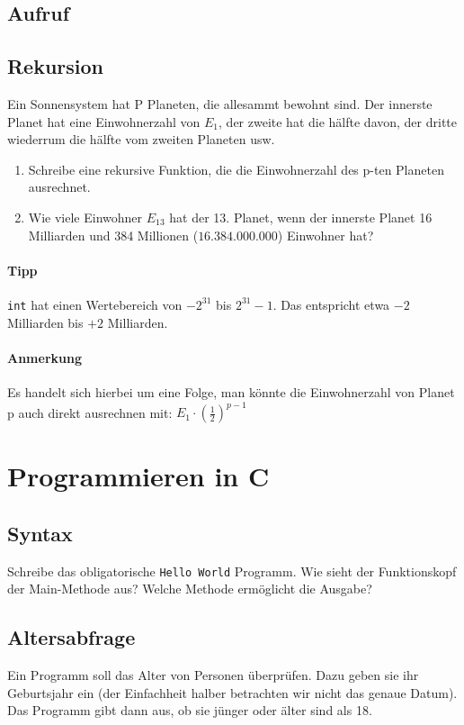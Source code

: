\documentclass[11pt, a4paper]{article}
\begin{document}




\subsection{Aufruf}

\subsection{Rekursion}
Ein Sonnensystem hat P Planeten, die allesammt bewohnt sind. Der innerste Planet hat eine Einwohnerzahl von $E_1$, der zweite hat die hälfte davon, der dritte wiederrum die hälfte vom zweiten Planeten usw.
\begin{enumerate}
	\item Schreibe eine rekursive Funktion, die die Einwohnerzahl des p-ten Planeten ausrechnet.
	\item Wie viele Einwohner $E_{13}$ hat der 13. Planet, wenn der innerste Planet 16 Milliarden und 384 Millionen ($16.384.000.000$) Einwohner hat?
\end{enumerate}
\paragraph{Tipp} \texttt{int} hat einen Wertebereich von $-2^{31}$ bis $2^{31}-1$. Das entspricht etwa $-2$ Milliarden bis $+2$ Milliarden.
\paragraph{Anmerkung} Es handelt sich hierbei um eine Folge, man könnte die Einwohnerzahl von Planet p auch direkt ausrechnen mit: $E_1 \cdot \left(\frac{1}{2}\right)^{p-1}$


\newpage
\section{Programmieren in C}
\subsection{Syntax}
Schreibe das obligatorische \texttt{Hello World} Programm. Wie sieht der Funktionskopf der Main-Methode aus? Welche Methode ermöglicht die Ausgabe?


\subsection{Altersabfrage}
Ein Programm soll das Alter von Personen überprüfen. Dazu geben sie ihr Geburtsjahr ein (der Einfachheit halber betrachten wir nicht das genaue Datum). Das Programm gibt dann aus, ob sie jünger oder älter sind als 18.
\end{document}
